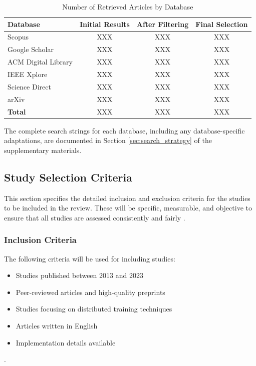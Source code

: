 \begin{table}[ht]
	\centering
	\caption{Number of Retrieved Articles by Database}
	\label{tab:search_results}
	\begin{tabular}{|l|c|c|c|}
		\hline
		\textbf{Database}   & \textbf{Initial Results} & \textbf{After Filtering} & \textbf{Final Selection} \\
		\hline
		Scopus              & XXX                      & XXX                      & XXX                      \\
		\hline
		Google Scholar      & XXX                      & XXX                      & XXX                      \\
		\hline
		ACM Digital Library & XXX                      & XXX                      & XXX                      \\
		\hline
		IEEE Xplore         & XXX                      & XXX                      & XXX                      \\
		\hline
		Science Direct      & XXX                      & XXX                      & XXX                      \\
		\hline
		arXiv               & XXX                      & XXX                      & XXX                      \\
		\hline
		\textbf{Total}      & XXX                      & XXX                      & XXX                      \\
		\hline
	\end{tabular}
\end{table}

The complete search strings for each database, including any database-specific adaptations, are
documented in Section \ref{sec:search_strategy} of the supplementary materials.

\subsection{Study Selection Criteria}
\label{sec:study-selection-criteria}
This section specifies the detailed inclusion and exclusion criteria for the studies to be included
in the review. These will be specific, measurable, and objective to ensure that all studies are
assessed consistently and fairly \cite{ben-nun_demystifying_2020}.

\subsubsection{Inclusion Criteria}
The following criteria will be used for including studies:
\begin{itemize}
	\item Studies published between 2013 and 2023
	\item Peer-reviewed articles and high-quality preprints
	\item Studies focusing on distributed training techniques
	\item Articles written in English
	\item Implementation details available
\end{itemize}
\cite{verbraeken_survey_2021,ben-nun_demystifying_2020}.

